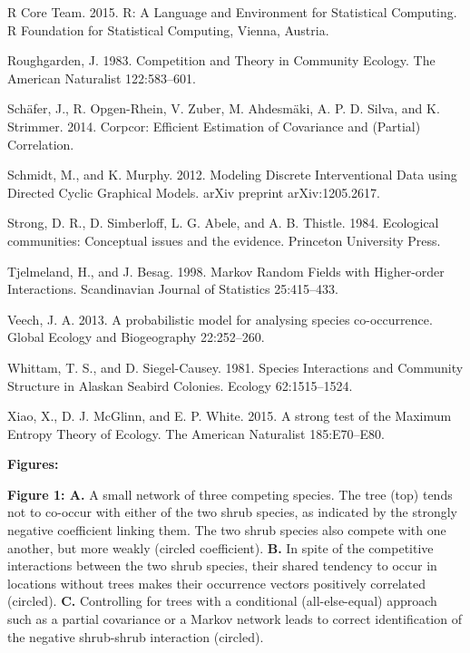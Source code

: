 \documentclass[12pt,]{article}
\begin{document}
\begin{spacing}{1.9}
\begin{flushleft}
R Core Team. 2015. R: A Language and Environment for Statistical
Computing. R Foundation for Statistical Computing, Vienna, Austria.

Roughgarden, J. 1983. Competition and Theory in Community Ecology. The
American Naturalist 122:583--601.

Schäfer, J., R. Opgen-Rhein, V. Zuber, M. Ahdesmäki, A. P. D. Silva, and
K. Strimmer. 2014. Corpcor: Efficient Estimation of Covariance and
(Partial) Correlation.

Schmidt, M., and K. Murphy. 2012. Modeling Discrete Interventional Data
using Directed Cyclic Graphical Models. arXiv preprint arXiv:1205.2617.

Strong, D. R., D. Simberloff, L. G. Abele, and A. B. Thistle. 1984.
Ecological communities: Conceptual issues and the evidence. Princeton
University Press.

Tjelmeland, H., and J. Besag. 1998. Markov Random Fields with
Higher-order Interactions. Scandinavian Journal of Statistics
25:415--433.

Veech, J. A. 2013. A probabilistic model for analysing species
co-occurrence. Global Ecology and Biogeography 22:252--260.

Whittam, T. S., and D. Siegel-Causey. 1981. Species Interactions and
Community Structure in Alaskan Seabird Colonies. Ecology 62:1515--1524.

Xiao, X., D. J. McGlinn, and E. P. White. 2015. A strong test of the
Maximum Entropy Theory of Ecology. The American Naturalist 185:E70--E80.

\setlength{\parindent}{0cm} \setlength{\leftskip}{0cm}

\noindent \textbf{Figures:}

\textbf{Figure 1: A.} A small network of three competing species. The
tree (top) tends not to co-occur with either of the two shrub species,
as indicated by the strongly negative coefficient linking them. The two
shrub species also compete with one another, but more weakly (circled
coefficient). \textbf{B.} In spite of the competitive interactions
between the two shrub species, their shared tendency to occur in
locations without trees makes their occurrence vectors positively
correlated (circled). \textbf{C.} Controlling for trees with a
conditional (all-else-equal) approach such as a partial covariance or a
Markov network leads to correct identification of the negative
shrub-shrub interaction (circled).


\end{flushleft}
\end{spacing}
\end{document}

